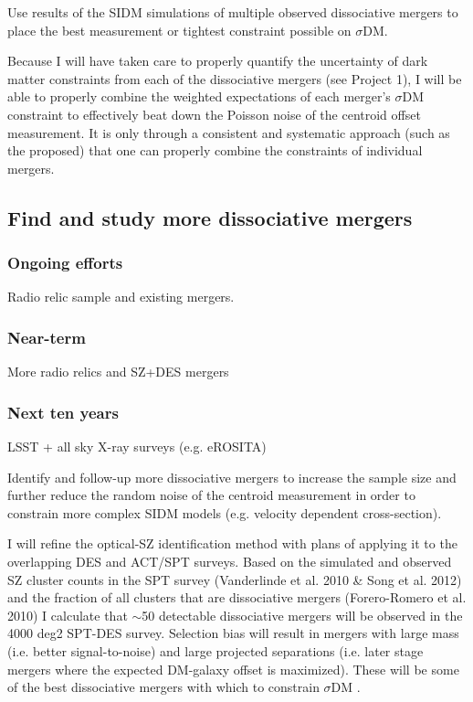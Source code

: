 Use results of the SIDM simulations of multiple observed dissociative mergers to place the best measurement or tightest constraint possible on $\sigma$DM.  

Because I will have taken care to properly quantify the uncertainty of dark matter constraints from each of the dissociative mergers (see Project 1), I will be able to properly combine the weighted expectations of each merger’s $\sigma$DM  constraint to effectively beat down the Poisson noise of the centroid offset measurement.   It is only through a consistent and systematic approach (such as the proposed) that one can properly combine the constraints of individual mergers. 

\subsection{Find and study more dissociative mergers}

\subsubsection{Ongoing efforts}

Radio relic sample and existing mergers.

\subsubsection{Near-term}

More radio relics and SZ+DES mergers

\subsubsection{Next ten years}

LSST + all sky X-ray surveys (e.g. eROSITA)

Identify and follow-up more dissociative mergers to increase the sample size and further reduce the random noise of the centroid measurement in order to constrain more complex SIDM models (e.g. velocity dependent cross-section).

I will refine the optical-SZ identification method with plans of applying it to the overlapping DES and ACT/SPT surveys.  Based on the simulated and observed SZ cluster counts in the SPT survey (Vanderlinde et al. 2010 \& Song et al. 2012) and the fraction of all clusters that are dissociative mergers (Forero-Romero et al. 2010) I calculate that $\sim$50 detectable dissociative mergers will be observed in the 4000 deg2 SPT-DES survey.  Selection bias will result in mergers with large mass (i.e. better signal-to-noise) and large projected separations (i.e. later stage mergers where the expected DM-galaxy offset is maximized).  These will be some of the best dissociative mergers with which to constrain $\sigma$DM .

